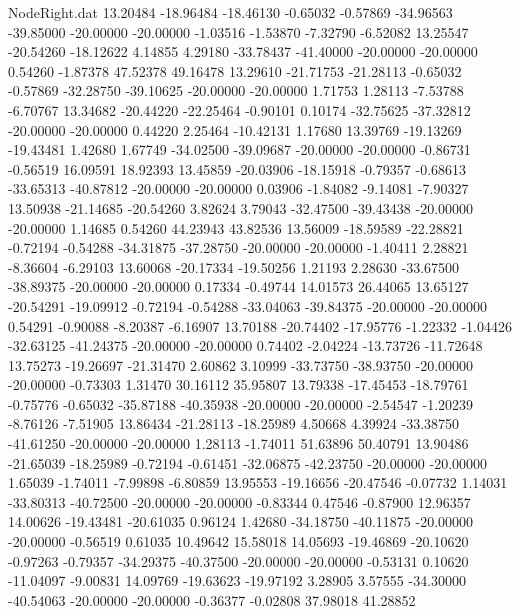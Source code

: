 \begin{filecontents}{NodeRight.dat}
  13.20484  -18.96484  -18.46130    -0.65032   -0.57869  -34.96563  -39.85000  -20.00000  -20.00000   -1.03516   -1.53870   -7.32790   -6.52082
  13.25547  -20.54260  -18.12622     4.14855    4.29180  -33.78437  -41.40000  -20.00000  -20.00000    0.54260   -1.87378   47.52378   49.16478
  13.29610  -21.71753  -21.28113    -0.65032   -0.57869  -32.28750  -39.10625  -20.00000  -20.00000    1.71753    1.28113   -7.53788   -6.70767
  13.34682  -20.44220  -22.25464    -0.90101    0.10174  -32.75625  -37.32812  -20.00000  -20.00000    0.44220    2.25464  -10.42131    1.17680
  13.39769  -19.13269  -19.43481     1.42680    1.67749  -34.02500  -39.09687  -20.00000  -20.00000   -0.86731   -0.56519   16.09591   18.92393
  13.45859  -20.03906  -18.15918    -0.79357   -0.68613  -33.65313  -40.87812  -20.00000  -20.00000    0.03906   -1.84082   -9.14081   -7.90327
  13.50938  -21.14685  -20.54260     3.82624    3.79043  -32.47500  -39.43438  -20.00000  -20.00000    1.14685    0.54260   44.23943   43.82536
  13.56009  -18.59589  -22.28821    -0.72194   -0.54288  -34.31875  -37.28750  -20.00000  -20.00000   -1.40411    2.28821   -8.36604   -6.29103
  13.60068  -20.17334  -19.50256     1.21193    2.28630  -33.67500  -38.89375  -20.00000  -20.00000    0.17334   -0.49744   14.01573   26.44065
  13.65127  -20.54291  -19.09912    -0.72194   -0.54288  -33.04063  -39.84375  -20.00000  -20.00000    0.54291   -0.90088   -8.20387   -6.16907
  13.70188  -20.74402  -17.95776    -1.22332   -1.04426  -32.63125  -41.24375  -20.00000  -20.00000    0.74402   -2.04224  -13.73726  -11.72648
  13.75273  -19.26697  -21.31470     2.60862    3.10999  -33.73750  -38.93750  -20.00000  -20.00000   -0.73303    1.31470   30.16112   35.95807
  13.79338  -17.45453  -18.79761    -0.75776   -0.65032  -35.87188  -40.35938  -20.00000  -20.00000   -2.54547   -1.20239   -8.76126   -7.51905
  13.86434  -21.28113  -18.25989     4.50668    4.39924  -33.38750  -41.61250  -20.00000  -20.00000    1.28113   -1.74011   51.63896   50.40791
  13.90486  -21.65039  -18.25989    -0.72194   -0.61451  -32.06875  -42.23750  -20.00000  -20.00000    1.65039   -1.74011   -7.99898   -6.80859
  13.95553  -19.16656  -20.47546    -0.07732    1.14031  -33.80313  -40.72500  -20.00000  -20.00000   -0.83344    0.47546   -0.87900   12.96357
  14.00626  -19.43481  -20.61035     0.96124    1.42680  -34.18750  -40.11875  -20.00000  -20.00000   -0.56519    0.61035   10.49642   15.58018
  14.05693  -19.46869  -20.10620    -0.97263   -0.79357  -34.29375  -40.37500  -20.00000  -20.00000   -0.53131    0.10620  -11.04097   -9.00831
  14.09769  -19.63623  -19.97192     3.28905    3.57555  -34.30000  -40.54063  -20.00000  -20.00000   -0.36377   -0.02808   37.98018   41.28852

\end{filecontents}
